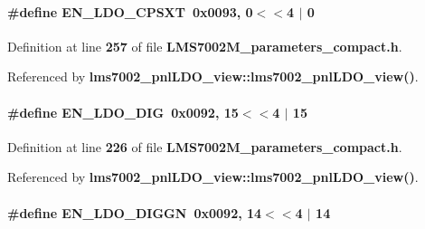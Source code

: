 \paragraph[{E\+N\+\_\+\+L\+D\+O\+\_\+\+C\+P\+S\+XT}]{\setlength{\rightskip}{0pt plus 5cm}\#define E\+N\+\_\+\+L\+D\+O\+\_\+\+C\+P\+S\+XT~0x0093, 0$<$$<$4 $\vert$  0}\label{LMS7002M__parameters__compact_8h_aee2aadb05be6076db03fb1bee1313f8a}


Definition at line {\bf 257} of file {\bf L\+M\+S7002\+M\+\_\+parameters\+\_\+compact.\+h}.



Referenced by {\bf lms7002\+\_\+pnl\+L\+D\+O\+\_\+view\+::lms7002\+\_\+pnl\+L\+D\+O\+\_\+view()}.

\paragraph[{E\+N\+\_\+\+L\+D\+O\+\_\+\+D\+IG}]{\setlength{\rightskip}{0pt plus 5cm}\#define E\+N\+\_\+\+L\+D\+O\+\_\+\+D\+IG~0x0092, 15$<$$<$4 $\vert$  15}\label{LMS7002M__parameters__compact_8h_a4a349a662689631851bdb6db75894dbe}


Definition at line {\bf 226} of file {\bf L\+M\+S7002\+M\+\_\+parameters\+\_\+compact.\+h}.



Referenced by {\bf lms7002\+\_\+pnl\+L\+D\+O\+\_\+view\+::lms7002\+\_\+pnl\+L\+D\+O\+\_\+view()}.

\paragraph[{E\+N\+\_\+\+L\+D\+O\+\_\+\+D\+I\+G\+GN}]{\setlength{\rightskip}{0pt plus 5cm}\#define E\+N\+\_\+\+L\+D\+O\+\_\+\+D\+I\+G\+GN~0x0092, 14$<$$<$4 $\vert$  14}\label{LMS7002M__parameters__compact_8h_a0bca18faa53c0065a414b8ce125d9d64}


